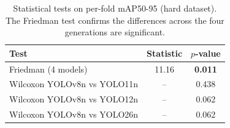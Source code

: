 \begin{table}[t]
\caption{Statistical tests on per-fold mAP50-95 (hard dataset). The Friedman test confirms the differences across the four generations are significant.}
\label{tab:stats}
\centering\footnotesize\renewcommand{\arraystretch}{1.3}
\begin{tabular}{@{}lcc@{}}
\toprule
\textbf{Test} & \textbf{Statistic} & \textbf{$p$-value} \\
\midrule
Friedman (4 models) & 11.16 & \textbf{0.011} \\
Wilcoxon YOLOv8n vs YOLO11n & -- & 0.438 \\
Wilcoxon YOLOv8n vs YOLO12n & -- & 0.062 \\
Wilcoxon YOLOv8n vs YOLO26n & -- & 0.062 \\
\bottomrule
\end{tabular}
\end{table}

